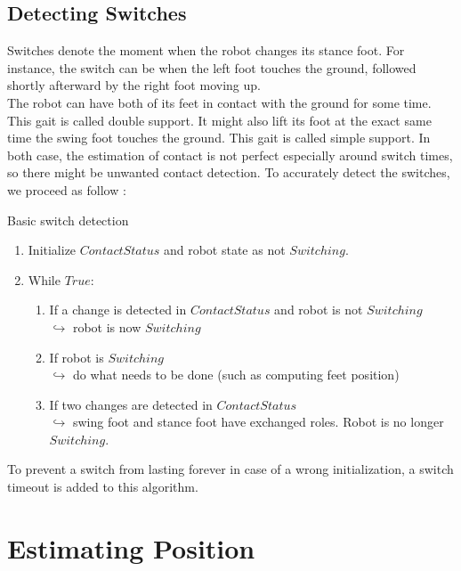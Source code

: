 \documentclass[a4paper,10pt]{article}
\begin{document}
\subsection{Detecting Switches}
Switches denote the moment when the robot changes its stance foot. For instance, the switch can be when the left foot touches the ground, followed shortly afterward by the right foot moving up.\\
The robot can have both of its feet in contact with the ground for some time. This gait is called double support. It might also lift its foot at the exact same time the swing foot touches the ground. This gait is called simple support. In both case, the estimation of contact is not perfect especially around switch times, so there might be unwanted contact detection. To accurately detect the switches, we proceed as follow : 
\begin{algorithm}[htb]
  \caption{Basic switch detection}
  \begin{enumerate}
    \item
    Initialize $Contact Status$ and robot state as not $Switching$.

    \item
    While $True$:
    \begin{enumerate}
      \item
      If a change is detected in $Contact Status$ and robot is not $Switching$\\
      $\hookrightarrow$ robot is now $Switching$

      \item
      If robot is $Switching$\\
      $\hookrightarrow$ do what needs to be done (such as computing feet position)

      \item
      If two changes are detected in $Contact Status$ \\
      $\hookrightarrow$ swing foot and stance foot have exchanged roles. Robot is no longer $Switching$.
    \end{enumerate}
  \end{enumerate}
\end{algorithm}
To prevent a switch from lasting forever in case of a wrong initialization, a switch timeout is added to this algorithm.

\section{Estimating Position}
\end{document}

